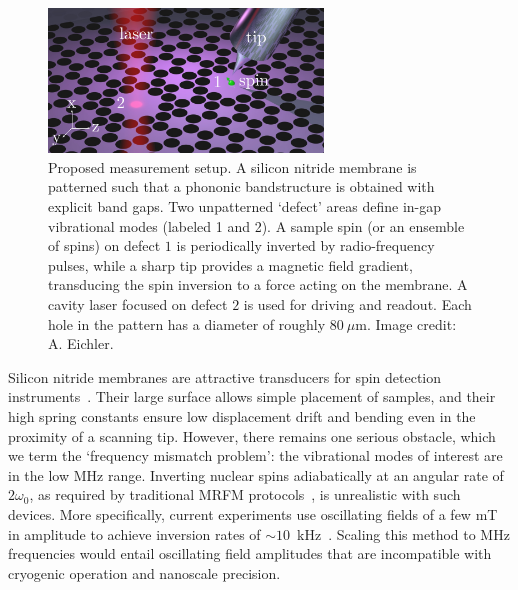 \begin{figure}
	\centering
	\includegraphics[width=0.65\textwidth]{figures/spins/fig1.pdf} %
	\caption{\label{fig:spins_fig1} Proposed measurement setup. A silicon nitride membrane is patterned such that a phononic bandstructure is obtained with explicit band gaps. Two unpatterned `defect' areas define in-gap vibrational modes (labeled 1 and 2). A sample spin (or an ensemble of spins) on defect $1$ is periodically inverted by radio-frequency pulses, while a sharp tip provides a magnetic field gradient, transducing the spin inversion to a force acting on the membrane. A cavity laser focused on defect $2$ is used for driving and readout. Each hole in the pattern has a diameter of roughly $80~\mu$m. Image credit: A. Eichler.}
\end{figure}

Silicon nitride membranes are attractive transducers for spin detection instruments~\cite{Scozzaro_2016, Blankenhorn_2017, Takahashi_2018, Fischer_2019}. Their large surface allows simple placement of samples, and their high spring constants ensure low displacement drift and bending even in the proximity of a scanning tip. However, there remains one serious obstacle, which we term the `frequency mismatch problem': the vibrational modes of interest are in the low MHz range. Inverting nuclear spins adiabatically at an angular rate of $2\omega_0$, as required by traditional MRFM protocols~\cite{Sidles_1991, Degen_2009}, is unrealistic with such devices. More specifically, current experiments use oscillating fields of a few mT in amplitude to achieve inversion rates of $\sim 10$~kHz~\cite{Grob_2019}. Scaling this method to MHz frequencies would entail oscillating field amplitudes that are incompatible with cryogenic operation and nanoscale precision.

